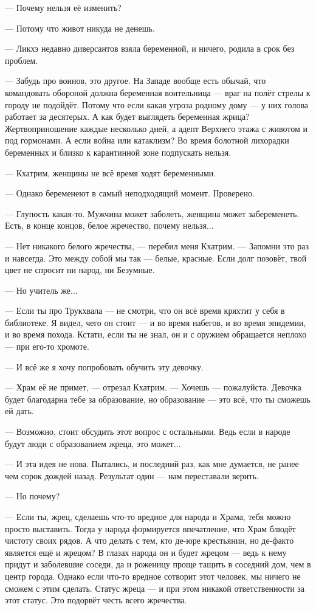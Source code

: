 --- Почему нельзя её изменить?

--- Потому что живот никуда не денешь.

--- Ликхэ недавно диверсантов взяла беременной, и ничего, родила в срок без проблем.

--- Забудь про воинов, это другое.
На Западе вообще есть обычай, что командовать обороной должна беременная воительница --- враг на полёт стрелы к городу не подойдёт.
Потому что если какая угроза родному дому --- у них голова работает за десятерых.
А как будет выглядеть беременная жрица?
Жертвоприношение каждые несколько дней, а адепт Верхнего этажа с животом и под гормонами.
А если война или катаклизм?
Во время болотной лихорадки беременных и близко к карантинной зоне подпускать нельзя.

--- Кхатрим, женщины не всё время ходят беременными.

--- Однако беременеют в самый неподходящий момент.
Проверено.

--- Глупость какая-то.
Мужчина может заболеть, женщина может забеременеть.
Есть, в конце концов, белое жречество, почему нельзя...

--- Нет никакого белого жречества, --- перебил меня Кхатрим.
--- Запомни это раз и навсегда.
Это между собой мы так --- белые, красные.
Если долг позовёт, твой цвет не спросит ни народ, ни Безумные.

--- Но учитель же...

--- Если ты про Трукхвала --- не смотри, что он всё время кряхтит у себя в библиотеке.
Я видел, чего он стоит --- и во время набегов, и во время эпидемии, и во время похода.
Кстати, если ты не знал, он и с оружием обращается неплохо --- при его-то хромоте.

--- И всё же я хочу попробовать обучить эту девочку.

--- Храм её не примет, --- отрезал Кхатрим.
--- Хочешь --- пожалуйста.
Девочка будет благодарна тебе за образование, но образование --- это всё, что ты сможешь ей дать.

--- Возможно, стоит обсудить этот вопрос с остальными.
Ведь если в народе будут люди с образованием жреца, это может...

--- И эта идея не нова.
Пытались, и последний раз, как мне думается, не ранее чем сорок дождей назад.
Результат один --- нам переставали верить.

--- Но почему?

--- Если ты, жрец, сделаешь что-то вредное для народа и Храма, тебя можно просто выставить.
Тогда у народа формируется впечатление, что Храм блюдёт чистоту своих рядов.
А что делать с тем, кто де-юре крестьянин, но де-факто является ещё и жрецом?
В глазах народа он и будет жрецом --- ведь к нему придут и заболевшие соседи, да и роженицу проще тащить в соседний дом, чем в центр города.
Однако если что-то вредное сотворит этот человек, мы ничего не сможем с этим сделать.
Статус жреца --- и при этом никакой ответственности за этот статус.
Это подорвёт честь всего жречества.

